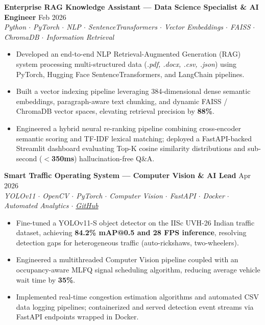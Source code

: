 \documentclass[a4paper,10pt]{article}
\begin{document}
\vspace{2pt}

\textbf{Enterprise RAG Knowledge Assistant --- Data Science Specialist \& AI Engineer} \hfill Feb 2026\\
\textit{Python $\cdot$ PyTorch $\cdot$ NLP $\cdot$ SentenceTransformers $\cdot$ Vector Embeddings $\cdot$ FAISS $\cdot$ ChromaDB $\cdot$ Information Retrieval}
\begin{itemize}
\item Developed an end-to-end NLP Retrieval-Augmented Generation (RAG) system processing multi-structured data (\textit{.pdf, .docx, .csv, .json}) using PyTorch, Hugging Face SentenceTransformers, and LangChain pipelines.
\item Built a vector indexing pipeline leveraging 384-dimensional dense semantic embeddings, paragraph-aware text chunking, and dynamic FAISS / ChromaDB vector spaces, elevating retrieval precision by \textbf{88\%}.
\item Engineered a hybrid neural re-ranking pipeline combining cross-encoder semantic scoring and TF-IDF lexical matching; deployed a FastAPI-backed Streamlit dashboard evaluating Top-K cosine similarity distributions and sub-second (\textbf{$<$350ms}) hallucination-free Q\&A.
\end{itemize}

\vspace{2pt}

\textbf{Smart Traffic Operating System --- Computer Vision \& AI Lead} \hfill Apr 2026\\
\textit{YOLOv11 $\cdot$ OpenCV $\cdot$ PyTorch $\cdot$ Computer Vision $\cdot$ FastAPI $\cdot$ Docker $\cdot$ Automated Analytics $\cdot$ \href{https://github.com/ThanujMaligi/Traffic-Flow-Simulation-Using-OS-Based-Algorithms-}{GitHub}}
\begin{itemize}
\item Fine-tuned a YOLOv11-S object detector on the IISc UVH-26 Indian traffic dataset, achieving \textbf{84.2\% mAP@0.5 and 28 FPS inference}, resolving detection gaps for heterogeneous traffic (auto-rickshaws, two-wheelers).
\item Engineered a multithreaded Computer Vision pipeline coupled with an occupancy-aware MLFQ signal scheduling algorithm, reducing average vehicle wait time by \textbf{35\%}.
\item Implemented real-time congestion estimation algorithms and automated CSV data logging pipelines; containerized and served detection event streams via FastAPI endpoints wrapped in Docker.
\end{itemize}
\end{document}
